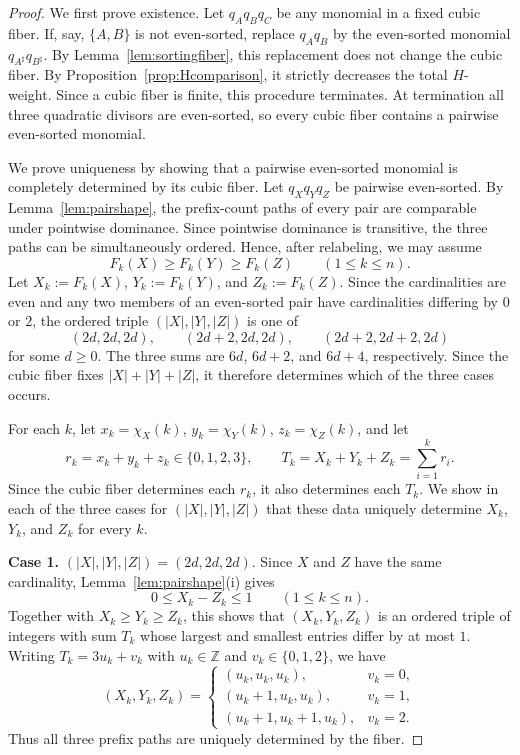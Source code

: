 \documentclass[11pt]{amsart}
\theoremstyle{definition}
\numberwithin{equation}{section}
\begin{document}
\begin{proof}
We first prove existence. Let $q_Aq_Bq_C$ be any monomial in a fixed cubic fiber. If, say, $\{A,B\}$ is not even-sorted, replace $q_Aq_B$ by the even-sorted monomial $q_{A^\sharp}q_{B^\sharp}$. By Lemma~\ref{lem:sortingfiber}, this replacement does not change the cubic fiber. By Proposition~\ref{prop:Hcomparison}, it strictly decreases the total $H$-weight. Since a cubic fiber is finite, this procedure terminates. At termination all three quadratic divisors are even-sorted, so every cubic fiber contains a pairwise even-sorted monomial.

We prove uniqueness by showing that a pairwise even-sorted monomial is completely determined by its cubic fiber. Let $q_Xq_Yq_Z$ be pairwise even-sorted. By Lemma~\ref{lem:pairshape}, the prefix-count paths of every pair are comparable under pointwise dominance. Since pointwise dominance is transitive, the three paths can be simultaneously ordered. Hence, after relabeling, we may assume
\[
 F_k(X)\ge F_k(Y)\ge F_k(Z)
 \qquad(1\le k\le n).
\]
Let $ X_k:=F_k(X)$, $Y_k:=F_k(Y)$, and $Z_k:=F_k(Z)$.
Since the cardinalities are even and any two members of an even-sorted pair have cardinalities differing by $0$ or $2$, the ordered triple $(|X|,|Y|,|Z|)$ is one of
\[
 (2d,2d,2d),\qquad (2d+2,2d,2d),\qquad (2d+2,2d+2,2d)
\]
for some $d\ge0$. 
The three sums are $6d$, $6d+2$, and $6d+4$,
respectively. 
Since the cubic fiber fixes $|X|+|Y|+|Z|$, it therefore determines which of the three cases occurs.

For each $k$, let
$x_k=\chi_X(k)$, $y_k=\chi_Y(k)$, $z_k=\chi_Z(k)$, 
and let
$$
r_k=x_k + y_k + z_k \in\{0,1,2,3\},
\qquad
T_k=X_k+Y_k+Z_k=\sum_{i=1}^k r_i.
$$
Since the cubic fiber determines each $r_k$, it also determines each $T_k$.
We show in each of the three cases for $(|X|,|Y|,|Z|)$ that these data uniquely determine $X_k$, $Y_k$, and $Z_k$ for every $k$.




\smallskip
\noindent
{\bf Case 1.} $(|X|,|Y|,|Z|)=(2d,2d,2d)$.
Since \(X\) and \(Z\) have the same cardinality, Lemma~\ref{lem:pairshape}(i) gives
$$
0\le X_k-Z_k\le1
\qquad(1\le k\le n).
$$
Together with $X_k\ge Y_k\ge Z_k$, this shows that $(X_k,Y_k,Z_k)$ is an ordered triple of integers with sum $T_k$ whose largest and smallest entries differ by at most $1$.
Writing $T_k=3u_k+v_k$ with
$u_k \in \mathbb{Z}$ and $v_k\in\{0,1,2\}$, we have
\[
 (X_k,Y_k,Z_k)=
 \begin{cases}
 (u_k,u_k,u_k),&v_k=0,\\
 (u_k+1,u_k,u_k),&v_k=1,\\
 (u_k+1,u_k+1,u_k),&v_k=2.
 \end{cases}
\]
Thus all three prefix paths are uniquely determined by the fiber.


\end{proof}
\end{document}
